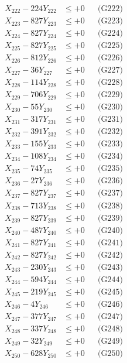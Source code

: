 \documentclass[a4paper,10pt]{article}
\begin{document}
{\begin{align}
X_{222} - 224Y_{222} &\leq +0 && \text{(G222)} \\
X_{223} - 827Y_{223} &\leq +0 && \text{(G223)} \\
X_{224} - 827Y_{224} &\leq +0 && \text{(G224)} \\
X_{225} - 827Y_{225} &\leq +0 && \text{(G225)} \\
X_{226} - 812Y_{226} &\leq +0 && \text{(G226)} \\
X_{227} - 36Y_{227} &\leq +0 && \text{(G227)} \\
X_{228} - 114Y_{228} &\leq +0 && \text{(G228)} \\
X_{229} - 706Y_{229} &\leq +0 && \text{(G229)} \\
X_{230} - 55Y_{230} &\leq +0 && \text{(G230)} \\
\allowbreak
X_{231} - 317Y_{231} &\leq +0 && \text{(G231)} \\
X_{232} - 391Y_{232} &\leq +0 && \text{(G232)} \\
X_{233} - 155Y_{233} &\leq +0 && \text{(G233)} \\
X_{234} - 108Y_{234} &\leq +0 && \text{(G234)} \\
X_{235} - 74Y_{235} &\leq +0 && \text{(G235)} \\
X_{236} - 27Y_{236} &\leq +0 && \text{(G236)} \\
X_{237} - 827Y_{237} &\leq +0 && \text{(G237)} \\
X_{238} - 713Y_{238} &\leq +0 && \text{(G238)} \\
X_{239} - 827Y_{239} &\leq +0 && \text{(G239)} \\
X_{240} - 487Y_{240} &\leq +0 && \text{(G240)} \\
\allowbreak
X_{241} - 827Y_{241} &\leq +0 && \text{(G241)} \\
X_{242} - 827Y_{242} &\leq +0 && \text{(G242)} \\
X_{243} - 230Y_{243} &\leq +0 && \text{(G243)} \\
X_{244} - 594Y_{244} &\leq +0 && \text{(G244)} \\
X_{245} - 219Y_{245} &\leq +0 && \text{(G245)} \\
X_{246} - 4Y_{246} &\leq +0 && \text{(G246)} \\
X_{247} - 377Y_{247} &\leq +0 && \text{(G247)} \\
X_{248} - 337Y_{248} &\leq +0 && \text{(G248)} \\
X_{249} - 32Y_{249} &\leq +0 && \text{(G249)} \\
X_{250} - 628Y_{250} &\leq +0 && \text{(G250)} \\

\end{align}}
\end{document}
